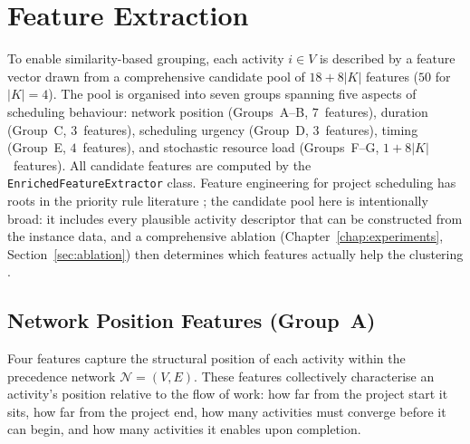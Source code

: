 \section{Feature Extraction}
\label{sec:features}
To enable similarity-based grouping, each activity $i \in V$ is
described by a feature vector drawn from a comprehensive candidate
pool of $18 + 8|K|$ features ($50$ for $|K|=4$). The pool is
organised into seven groups spanning five aspects of scheduling
behaviour: network position (Groups~A--B, $7$~features),
duration (Group~C, $3$~features), scheduling urgency
(Group~D, $3$~features), timing (Group~E, $4$~features), and
stochastic resource load (Groups~F--G, $1 + 8|K|$~features).
All candidate features are computed by the
\texttt{EnrichedFeatureExtractor} class. Feature engineering
for project scheduling has roots in the priority rule literature
\parencite{Kolisch1999}; the candidate pool here is
intentionally broad: it includes every plausible activity
descriptor that can be constructed from the instance data, and
a comprehensive ablation
(Chapter~\ref{chap:experiments},
Section~\ref{sec:ablation}) then determines which
features actually help the clustering
\parencite{Guyon2003}.

\subsection{Network Position Features (Group~A)}
\label{subsec:net_features}
Four features capture the structural position of each activity
within the precedence network $\mathcal{N} = (V, E)$. These
features collectively characterise an activity's position
relative to the flow of work: how far from the project start it
sits, how far from the project end, how many activities must
converge before it can begin, and how many activities it enables
upon completion.
